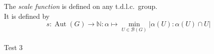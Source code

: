 \documentclass[preview]{standalone}
\begin{document}
The \textit{scale function} is defined on any t.d.l.c.\ group.\\It is defined by \[ s : \operatorname{Aut}(G) \to \mathbb{N} : \alpha \mapsto \min_{U \in \mathcal{B}(G)} |\alpha(U) : \alpha(U) \cap U | \]\\Test 3\\
\end{document}
